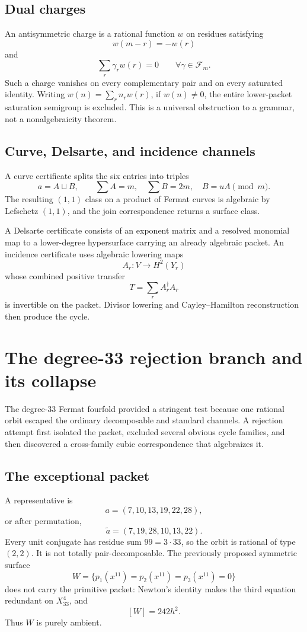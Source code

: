 \section{Dual charges}
An antisymmetric charge is a rational function \(w\) on residues satisfying
\[
w(m-r)=-w(r)
\]
and
\[
\sum_r\gamma_r w(r)=0
\qquad\forall \gamma\in\mathcal F_m.
\]
Such a charge vanishes on every complementary pair and on every saturated identity. Writing $w(n)=\sum_r n_r w(r)$, if \(w(n)\ne0\), the entire lower-packet saturation semigroup is excluded. This is a universal obstruction to a grammar, not a nonalgebraicity theorem.

\section{Curve, Delsarte, and incidence channels}
A curve certificate splits the six entries into triples
\[
a=A\sqcup B,
\qquad \sum A=m,
\quad \sum B=2m,
\quad B=uA\pmod m.
\]
The resulting \((1,1)\) class on a product of Fermat curves is algebraic by Lefschetz \((1,1)\), and the join correspondence returns a surface class.

A Delsarte certificate consists of an exponent matrix and a resolved monomial map to a lower-degree hypersurface carrying an already algebraic packet. An incidence certificate uses algebraic lowering maps
\[
A_r:V\to H^2(Y_r)
\]
whose combined positive transfer
\[
T=\sum_rA_r^\dagger A_r
\]
is invertible on the packet. Divisor lowering and Cayley--Hamilton reconstruction then produce the cycle.

\chapter{The degree-33 rejection branch and its collapse}
The degree-33 Fermat fourfold provided a stringent test because one rational orbit escaped the ordinary decomposable and standard channels. A rejection attempt first isolated the packet, excluded several obvious cycle families, and then discovered a cross-family cubic correspondence that algebraizes it.

\section{The exceptional packet}
A representative is
\[
a=(7,10,13,19,22,28),
\]
or after permutation,
\[
\widetilde a=(7,19,28,10,13,22).
\]
Every unit conjugate has residue sum \(99=3\cdot33\), so the orbit is rational of type \((2,2)\). It is not totally pair-decomposable. The previously proposed symmetric surface
\[
W=\{p_1(x^{11})=p_2(x^{11})=p_3(x^{11})=0\}
\]
does not carry the primitive packet: Newton's identity makes the third equation redundant on \(X_{33}^4\), and
\[
[W]=242h^2.
\]
Thus \(W\) is purely ambient.

